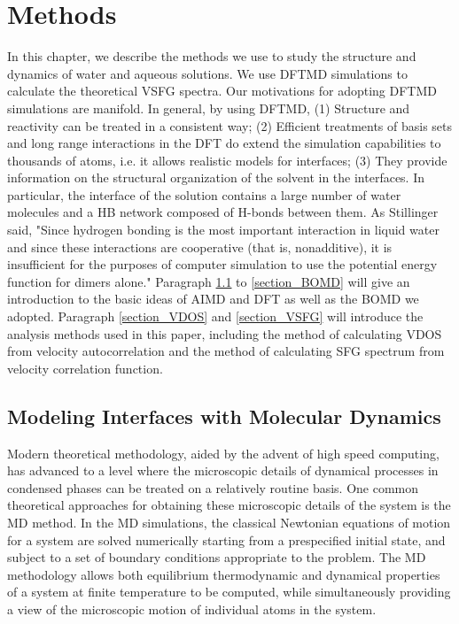 \raggedbottom
\chapter{Methods}\label{CHAPTER_Methods}
In this chapter, we describe the methods we use to study the structure and dynamics of water and aqueous solutions.
We use DFTMD simulations to calculate the theoretical VSFG spectra. 
Our motivations for adopting DFTMD simulations are manifold.
In general, by using DFTMD, 
(1) Structure and reactivity can be treated in a consistent way;
(2) Efficient treatments of basis sets and long range interactions in the DFT do extend the simulation capabilities to 
thousands of atoms, i.e. it allows realistic models for interfaces;
(3) They provide information on the structural organization of the solvent in the interfaces. 
In particular, the interface of the solution contains a large number of water molecules and a HB network composed of H-bonds between them.
As Stillinger said, "Since hydrogen bonding is the most important interaction in liquid water and since these interactions 
are cooperative (that is, nonadditive), it is insufficient for the purposes of computer simulation to use the potential energy function for dimers alone."\cite{Stillinger1980}
Paragraph \ref{section_AIMD} to \ref{section_BOMD} will give an introduction to the basic ideas of AIMD and DFT as well as the BOMD we adopted.
Paragraph \ref{section_VDOS} and \ref{section_VSFG} will introduce the analysis methods used in this paper, including the method of calculating VDOS from velocity autocorrelation and the method of calculating SFG spectrum from velocity correlation function.
\section{Modeling Interfaces with \abinitio Molecular Dynamics}\label{section_AIMD}
Modern theoretical methodology, aided by the advent of high speed computing, has advanced
to a level where the microscopic details of dynamical processes in condensed phases can be
treated on a relatively routine basis. One common theoretical approaches
for obtaining these microscopic details of the system is the MD method.
In the MD simulations,  the classical Newtonian equations of motion for
a system are solved numerically starting from a prespecified initial state, and subject to a set of
boundary conditions appropriate to the problem. The MD methodology allows both equilibrium
thermodynamic and dynamical properties of a system at finite temperature to be computed,
while simultaneously providing a view of the microscopic motion of individual atoms
in the system. \cite{Tuckerman2010}

